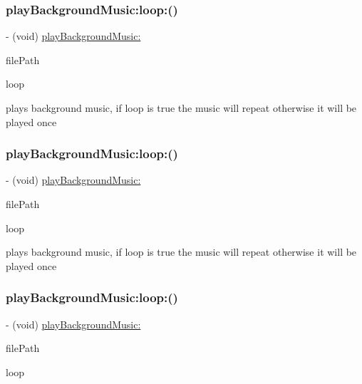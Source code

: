 \subsubsection{\texorpdfstring{play\+Background\+Music\+:loop\+:()}{playBackgroundMusic:loop:()}\hspace{0.1cm}{\footnotesize\ttfamily [2/4]}}
{\footnotesize\ttfamily -\/ (void) \hyperlink{interfaceSimpleAudioEngine_ae48157a1dea7e96833cb705bd6cd6709}{play\+Background\+Music\+:} \begin{DoxyParamCaption}\item[{(N\+S\+String$\ast$)}]{file\+Path }\item[{loop:(B\+O\+OL)}]{loop }\end{DoxyParamCaption}}

plays background music, if loop is true the music will repeat otherwise it will be played once \mbox{\label{interfaceSimpleAudioEngine_a57ba0d607696f7d86c66f03c321060ce}} 
\subsubsection{\texorpdfstring{play\+Background\+Music\+:loop\+:()}{playBackgroundMusic:loop:()}\hspace{0.1cm}{\footnotesize\ttfamily [3/4]}}
{\footnotesize\ttfamily -\/ (void) \hyperlink{interfaceSimpleAudioEngine_ae48157a1dea7e96833cb705bd6cd6709}{play\+Background\+Music\+:} \begin{DoxyParamCaption}\item[{(N\+S\+String $\ast$)}]{file\+Path }\item[{loop:(B\+O\+OL)}]{loop }\end{DoxyParamCaption}}

plays background music, if loop is true the music will repeat otherwise it will be played once \mbox{\label{interfaceSimpleAudioEngine_a57ba0d607696f7d86c66f03c321060ce}} 
\subsubsection{\texorpdfstring{play\+Background\+Music\+:loop\+:()}{playBackgroundMusic:loop:()}\hspace{0.1cm}{\footnotesize\ttfamily [4/4]}}
{\footnotesize\ttfamily -\/ (void) \hyperlink{interfaceSimpleAudioEngine_ae48157a1dea7e96833cb705bd6cd6709}{play\+Background\+Music\+:} \begin{DoxyParamCaption}\item[{(N\+S\+String $\ast$)}]{file\+Path }\item[{loop:(B\+O\+OL)}]{loop }\end{DoxyParamCaption}}

